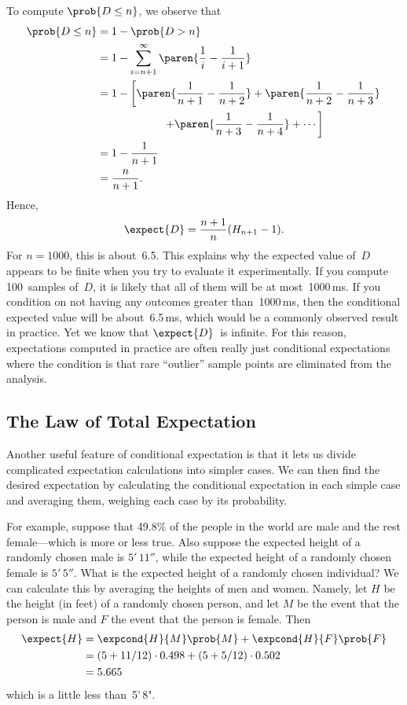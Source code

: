 To compute $\prob{D \le n}$, we observe that
\begin{align*}
\prob{D \le n}
    &= 1 - \prob{D > n} \\
    &= 1 - \sum_{i = n + 1}^\infty \paren{\frac{1}{i} - \frac{1}{i + 1}} \\
    &= 1 - \left[ \paren{\frac{1}{n + 1} - \frac{1}{n + 2}}
                + \paren{\frac{1}{n + 2} - \frac{1}{n + 3}} \right. \\
    &\qquad\qquad\qquad \left.           + \paren{\frac{1}{n + 3} - \frac{1}{n + 4}}
                + \cdots \right] \\
    &= 1 - \frac{1}{n + 1} \\
    &= \frac{n}{n + 1}.
\end{align*}
Hence,
\begin{equation}
    \expect{D} = \frac{n + 1}{n} (H_{n + 1} - 1).
\end{equation}
For $n = 1000$, this is about~6.5.  This explains why the expected
value of~$D$ appears to be finite when you try to evaluate it
experimentally.  If you compute 100~samples of~$D$, it is likely that
all of them will be at most~1000\,ms.  If you condition on not having
any outcomes greater than~1000\,ms, then the conditional expected
value will be about~6.5\,ms, which would be a commonly observed result
in practice.  Yet we know that $\expect{D}$~is infinite.  For this
reason, expectations computed in practice are often really just
conditional expectations where the condition is that rare ``outlier''
sample points are eliminated from the analysis.

\subsection{The Law of Total Expectation}

Another useful feature of conditional expectation is that it lets us
divide complicated expectation calculations into simpler cases.  We
can then find the desired expectation by calculating the conditional
expectation in each simple case and averaging them, weighing each case
by its probability.

For example, suppose that 49.8\% of the people in the world are male and
the rest female---which is more or less true.  Also suppose the expected
height of a randomly chosen male is $5'\,11''$, while the expected height
of a randomly chosen female is $5'\,5''$.  What is the expected height of a
randomly chosen individual?  We can calculate this by averaging the
heights of men and women.  Namely, let $H$ be the height (in feet) of a
randomly chosen person, and let $M$ be the event that the person is male
and $F$ the event that the person is female.  Then
\begin{align*}
\expect{H} &= \expcond{H}{M} \prob{M} + \expcond{H}{F} \prob{F}\\
&= (5 + 11/12) \cdot 0.498  + (5+ 5/12) \cdot 0.502\\
&= 5.665
\end{align*}
which is a little less than~5'\,8".

